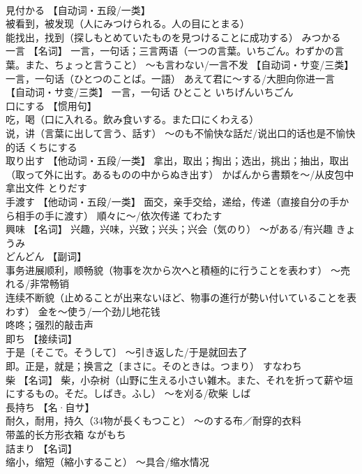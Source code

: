 \documentclass[8pt]{extreport}
\begin{document}
\begin{CJK}{UTF8}{min}
\\	見付かる	【自动词・五段/一类】 
\\	被看到，被发现（人にみつけられる。人の目にとまる） 
\\	能找出，找到（探しもとめていたものを見つけることに成功する）	みつかる	
\\	一言	【名词】 一言，一句话；三言两语（一つの言葉。いちごん。わずかの言葉。また、ちょっと言うこと） ～も言わない/一言不发 【自动词・サ变/三类】 一言，一句话（ひとつのことば。一語） あえて君に～する/大胆向你进一言 【自动词・サ变/三类】 一言，一句话	ひとこと いちげんいちごん	
\\	口にする	【惯用句】 
\\	吃，喝（口に入れる。飲み食いする。また口にくわえる） 
\\	说，讲（言葉に出して言う、話す） ～のも不愉快な話だ/说出口的话也是不愉快的话	くちにする	
\\	取り出す	【他动词・五段/一类】 拿出，取出；掏出；选出，挑出；抽出，取出（取って外に出す。あるものの中からぬき出す） かばんから書類を～/从皮包中拿出文件	とりだす	
\\	手渡す	【他动词・五段/一类】 面交，亲手交给，递给，传递（直接自分の手から相手の手に渡す） 順々に～/依次传递	てわたす	
\\	興味	【名词】 兴趣，兴味，兴致；兴头；兴会（気のり） ～がある/有兴趣	きょうみ	
\\	どんどん	【副词】 
\\	事务进展顺利，顺畅貌（物事を次から次へと積極的に行うことを表わす） ～売れる/非常畅销 
\\	连续不断貌（止めることが出来ないほど、物事の進行が勢い付いていることを表わす） 金を～使う/一个劲儿地花钱 
\\	咚咚；强烈的敲击声		
\\	即ち	【接续词】 
\\	于是〔そこで。そうして〕 ～引き返した/于是就回去了 
\\	即。正是，就是；换言之〔まさに。そのときは。つまり）	すなわち	
\\	柴	【名词】 柴，小杂树（山野に生える小さい雑木。また、それを折って薪や垣にするもの。そだ。しばき。ふし） ～を刈る/砍柴	しば	
\\	長持ち	【名·自サ】 
\\	耐久，耐用，持久（34物が長くもつこと） ～のする布／耐穿的衣料 
\\	带盖的长方形衣箱	ながもち	
\\	詰まり	【名词】 
\\	缩小，缩短（縮小すること） ～具合/缩水情况 

\end{CJK}
\end{document}
